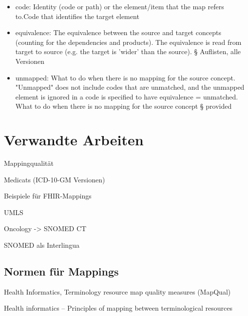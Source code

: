 \begin{itemize}
\item code: Identity (code or path) or the element/item that the map refers to.\newline Code that identifies the target element
\item equivalence: The equivalence between the source and target concepts (counting for the dependencies and products). The equivalence is read from target to source (e.g. the target is 'wider' than the source). \newline § Auflisten, alle Versionen
\item unmapped: What to do when there is no mapping for the source concept. "Unmapped" does not include codes that are unmatched, and the unmapped element is ignored in a code is specified to have equivalence = unmatched. \newline What to do when there is no mapping for the source concept \newline § provided
\end{itemize}

\section{Verwandte Arbeiten}

Mappingqualität

Medicats (ICD-10-GM Versionen)

Beispiele für FHIR-Mappings

UMLS

Oncology -> SNOMED CT

SNOMED als Interlingua







\subsection{Normen für Mappings}

Health Informatics, Terminology resource map quality measures (MapQual) \cite{ISO21564}


Health informatics -- Principles of mapping between terminological resources \cite{ISO12300}

\begin{comment}
\bibitem{WHO-FIC-Class}
``WHO-FIC Classifications and Terminology Mapping -- Principles and Best Practice'' \newline
\url{https://cdn.who.int/media/docs/default-source/classification/who-fic-network/whofic_terminology_mapping_guide.pdf?sfvrsn=2cae387c_7&download=true}

^ Qualität
\end{comment}


